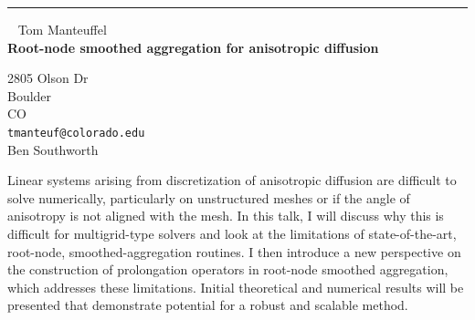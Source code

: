 \documentclass{report}
\begin{document}
\begin{center}
\rule{6in}{1pt} \
{\large Tom Manteuffel \\
{\bf Root-node smoothed aggregation for anisotropic diffusion}}

2805 Olson Dr \\ Boulder \\ CO
\\
{\tt tmanteuf@colorado.edu}\\
Ben Southworth
\end{center}

Linear systems arising from discretization of anisotropic diffusion are
difficult to solve numerically, particularly on unstructured meshes or if
the angle of anisotropy is not aligned with the mesh. In this talk, I
will discuss why this is difficult for multigrid-type solvers and look at
the limitations of
state-of-the-art, root-node, smoothed-aggregation routines. I then
introduce a new perspective on the construction of prolongation operators
in root-node smoothed aggregation, which addresses these limitations.
Initial theoretical and numerical results will be presented that
demonstrate potential for a robust and scalable method.
\end{document}
